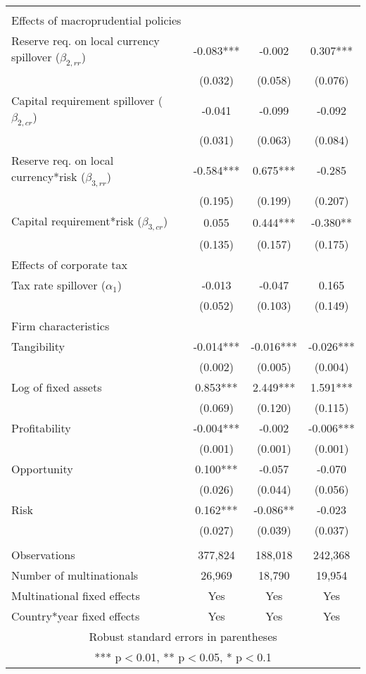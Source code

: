 \begin{longtable}{lccc}
 &  &  &  \\
 Effects of macroprudential policies  &  &  &  \\
\quad Reserve req. on local currency spillover ($\beta_{2,rr}$) & -0.083*** & -0.002 & 0.307*** \\
 & (0.032) & (0.058) & (0.076) \\
\quad Capital requirement spillover ($\beta_{2,cr}$) & -0.041 & -0.099 & -0.092 \\
 & (0.031) & (0.063) & (0.084) \\
\quad Reserve req. on local currency*risk ($\beta_{3,rr}$) & -0.584*** & 0.675*** & -0.285 \\
 & (0.195) & (0.199) & (0.207) \\
\quad Capital requirement*risk ($\beta_{3,cr}$) & 0.055 & 0.444*** & -0.380** \\
 & (0.135) & (0.157) & (0.175) \\
  Effects of corporate tax &  &  &  \\
\quad Tax rate spillover ($\alpha_{1}$) & -0.013 & -0.047 & 0.165 \\
 & (0.052) & (0.103) & (0.149) \\
   Firm characteristics &  &  &  \\
\quad Tangibility & -0.014*** & -0.016*** & -0.026*** \\
 & (0.002) & (0.005) & (0.004) \\
\quad Log of fixed assets & 0.853*** & 2.449*** & 1.591*** \\
 & (0.069) & (0.120) & (0.115) \\
\quad Profitability & -0.004*** & -0.002 & -0.006*** \\
 & (0.001) & (0.001) & (0.001) \\
\quad Opportunity & 0.100*** & -0.057 & -0.070 \\
 & (0.026) & (0.044) & (0.056) \\
\quad Risk & 0.162*** & -0.086** & -0.023 \\
 & (0.027) & (0.039) & (0.037) \\
 &  &  &  \\
Observations & 377,824 & 188,018 & 242,368 \\
Number of multinationals & 26,969 & 18,790 & 19,954 \\
Multinational fixed effects & Yes & Yes & Yes \\
 Country*year fixed effects & Yes & Yes & Yes \\ \hline
\multicolumn{4}{c}{ Robust standard errors in parentheses} \\
\multicolumn{4}{c}{ *** p$<$0.01, ** p$<$0.05, * p$<$0.1} \\
\end{longtable}

